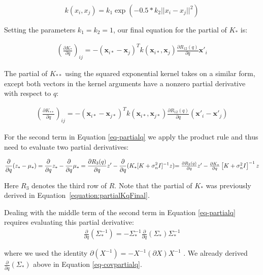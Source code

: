 \documentclass{article} %
\begin{document}
\begin{equation}
k(x_i,x_j) = k_1\exp(-0.5*k_2||x_i-x_j||^2)
\end{equation}

Setting the parameters $k_1 = k_2 = 1$, our final equation for the partial of $K_*$ is:

\begin{eqnarray}
\left(\frac{\partial K_*}{\partial q}\right)_{ij} = -(\mathbf{x}_{i*} - \mathbf{x}_j)^T k(\mathbf{x}_{i*}, \mathbf{x}_j) \frac{ \partial R_{12}(q)}{\partial q} \mathbf{x}'_i
\label{equation:partialKqFinal}
\end{eqnarray}

The partial of $K_{**}$ using the squared exponential kernel takes on a similar form, except both vectors in the kernel arguments have a nonzero partial derivative with respect to $q$:

\begin{eqnarray}
\left(\frac{\partial K_{**}}{\partial q}\right)_{ij} = -(\mathbf{x}_{i*} - \mathbf{x}_{j*})^T k(\mathbf{x}_{i*}, \mathbf{x}_{j*}) \frac{ \partial R_{12}(q)}{\partial q} (\mathbf{x}'_i - \mathbf{x}'_j)
\label{equation:partialKstarstarqFinal}
\end{eqnarray}

For the second term in Equation \ref{eq-partialq} we apply the product rule and thus need to evaluate two partial derivatives:

\begin{equation}
\frac{\partial}{\partial q} (z_* - \mu_*) = \frac{\partial}{\partial q} z_* - \frac{\partial}{\partial q} \mu_*
=  \frac{\partial R_3(q)}{\partial q}z' - \frac{\partial}{\partial q} (K_*[K + \sigma_n^2 I]^{-1} z)$$
$$= \frac{\partial R_3(q)}{\partial q}z' - \frac{\partial K_*}{\partial q} \left[K + \sigma_n^2 I\right]^{-1} z
\end{equation}

Here $R_3$ denotes the third row of $R$. Note that the partial of $K_*$ was previously derived in Equation~\ref{equation:partialKqFinal}.

Dealing with the middle term of the second term in Equation \ref{eq-partialq} requires evaluating this partial derivative:
\begin{eqnarray}
\frac{\partial}{\partial q} \left(\Sigma_*^{-1}\right) = -\Sigma_*^{-1} \frac{\partial}{\partial q}\left(\Sigma_*\right) \Sigma_*^{-1}
\label{eq:inversecov}
\end{eqnarray}

where we used the identity $\partial(X^{-1}) = - X^{-1} (\partial X) X^{-1}$ \cite{petersen2008matrix}. We already derived $\frac{\partial}{\partial q} (\Sigma_*)$ above in Equation \ref{eq-covpartialq}.
\end{document}
